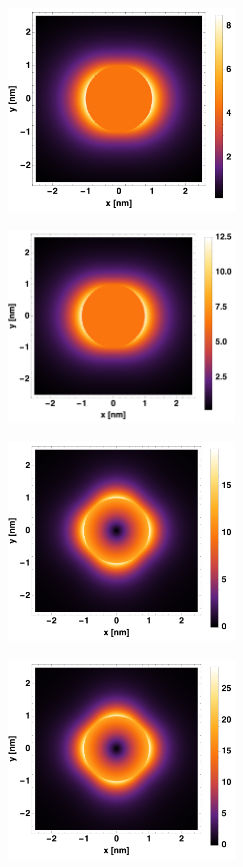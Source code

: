 \documentclass[a4paper,10pt]{article}
\begin{document}
\begin{figure}[htb!]
\begin{subfigure}[c]{0.5\textwidth}
\includegraphics[width=170pt]{ME1.pdf}
\caption{}
\end{subfigure}
\begin{subfigure}[c]{0.5\textwidth}
\includegraphics[width=170pt]{ME1(Mar).pdf}
\caption{}
\end{subfigure}
\begin{subfigure}[c]{0.5\textwidth}
\includegraphics[width=170pt]{ME2.pdf}
\caption{}
\end{subfigure}
\begin{subfigure}[c]{0.5\textwidth}
\includegraphics[width=170pt]{ME2(Mar).pdf}

\end{subfigure}
\end{figure}
\end{document}
